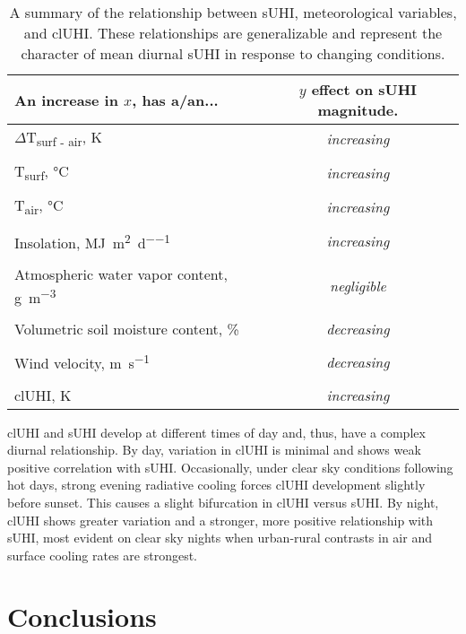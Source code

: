 \begin{bibunit}
\begin{table}[H]
	\centering
	\caption{A summary of the relationship between sUHI, meteorological variables, and clUHI. These relationships are generalizable and represent the character of mean diurnal sUHI in response to changing conditions.}
	\label{meteo_cont}
	\begin{tabular}{lc}
		\toprule 
		An increase in $x$, has a/an... & $y$ effect on sUHI magnitude. \\
		\midrule
		$\Delta$T\textsubscript{surf - air}, \si{\kelvin} &\textit{increasing} \\
		&\\
		T\textsubscript{surf}, \si{\degreeCelsius}  & \textit{increasing} \\
		&\\
		T\textsubscript{air}, \si{\degreeCelsius} & \textit{increasing} \\
		&\\
		Insolation, \si{\mega\joule\per\meter\squared\per\day} & \textit{increasing}  \\
		& \\
		Atmospheric water vapor content, \si{\gram\per\meter\cubed} & \textit{negligible} \\
		&\\
		Volumetric soil moisture content, \si{\percent} & \textit{decreasing} \\
		&\\
		Wind velocity, \si{\meter\per\second} &\textit{decreasing} \\
		&\\
		clUHI, \si{\kelvin} &\textit{increasing} \\
		\bottomrule
	\end{tabular} 
\end{table}

clUHI and sUHI develop at different times of day and, thus, have a complex diurnal relationship. By day, variation in clUHI is minimal and shows weak positive correlation with sUHI. Occasionally, under clear sky conditions following hot days, strong evening radiative cooling forces clUHI development slightly before sunset. This causes a slight bifurcation in clUHI versus sUHI. By night, clUHI shows greater variation and a stronger, more positive relationship with sUHI, most evident on clear sky nights when urban-rural contrasts in air and surface cooling rates are strongest. 

\section{Conclusions}


\end{bibunit}
